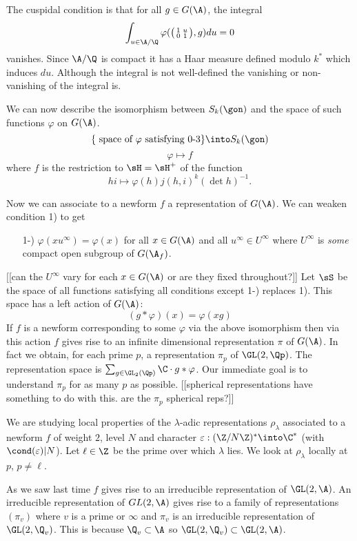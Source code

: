 \documentclass{report}
\begin{document}
The cuspidal condition is that for all $g\in G(\A)$, the integral
$$\int_{u\in\A/\Q} \varphi(\bigl(\begin{smallmatrix}1&u\\0&1\end{smallmatrix}\bigr),g)du=0$$
vanishes. Since $\A/\Q$ is compact it has a Haar measure defined modulo
$k^{*}$ which induces $du$. Although the integral is not well-defined
the vanishing or non-vanishing of the integral is.

We can now describe the isomorphism between $S_k(\gon)$ and the space
of such functions $\varphi$ on $G(\A)$.
$$\{\text{ space of $\varphi$ satisfying 0-3}\}\into S_k(\gon)$$
$$\varphi\mapsto f$$
where $f$ is the restriction to $\sH=\sH^{+}$ of the function
$$hi\mapsto\varphi(h)j(h,i)^k(\det h)^{-1}.$$

Now we can associate to a newform $f$ a representation of
$G(\A)$. We can weaken condition 1) to get
\begin{itemize}
\item[1-)] $\varphi(xu^{\infty})=\varphi(x)$ for all $x\in G(\A)$
and all $u^{\infty}\in U^{\infty}$ where $U^{\infty}$ is
{\em some} compact open subgroup of $G(\A_f)$.
\end{itemize}
[[can the $U^{\infty}$ vary for each $x\in G(\A)$ or
are they fixed throughout?]]
Let $\sS$ be the space of all functions satisfying all
conditions except 1-) replaces 1).
This space has a left action of $G(\A)$:
$$(g*\varphi)(x)=\varphi(xg)$$
If $f$ is a newform corresponding to some $\varphi$ via
the above isomorphism then via this action $f$ gives rise to an infinite
dimensional representation $\pi$ of $G(\A)$. In fact
we obtain, for each prime $p$, a representation $\pi_p$
of $\GL(2,\Qp)$. The representation space is
$\sum_{g\in\GL_2(\Qp)}\C\cdot{}g*\varphi$. Our immediate
goal is to understand $\pi_p$ for as many $p$ as possible.
[[spherical representations have something to do with
this. are the $\pi_p$ spherical reps?]]


We are studying local properties of the $\lambda$-adic representations
$\rho_{\lambda}$ associated to a newform $f$ of weight $2$, level
$N$ and character $\varepsilon:(\Z/N\Z)^*\into\C^*$
(with $\cond(\varepsilon)|N$). Let $\ell\in\Z$ be the prime over which
$\lambda$ lies. We look at $\rho_{\lambda}$ locally at $p$, $p\neq\ell$.

As we saw last time $f$ gives rise to an irreducible representation
of $\GL(2,\A)$. An irreducible representation of $GL(2,\A)$ gives rise
to a family of representations $(\pi_v)$ where $v$ is a prime
or $\infty$ and $\pi_v$ is an irreducible representation of $\GL(2,\Q_v)$.
This is because $\Q_v\subset\A$ so $\GL(2,\Q_v)\subset\GL(2,\A)$.
\end{document}
